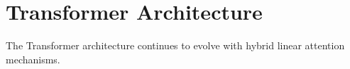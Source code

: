 \section{Transformer Architecture}
The Transformer architecture continues to evolve with hybrid linear attention mechanisms.
